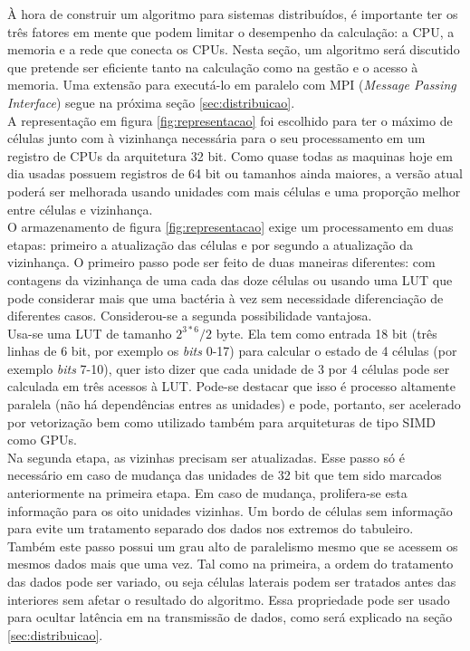 \label{sec:algoritmo}

À hora de construir um algoritmo para sistemas distribuídos, é importante ter os três fatores em mente que podem limitar o desempenho da calculação: a CPU, a memoria e a rede que conecta os CPUs. Nesta seção, um algoritmo será discutido que pretende ser eficiente tanto na calculação como na gestão e o acesso à memoria. Uma extensão para executá-lo em paralelo com MPI (\textit{Message Passing Interface}) segue na próxima seção \ref{sec:distribuicao}.\\

A representação em figura \ref{fig:representacao} foi escolhido para ter o máximo de células junto com à vizinhança necessária para o seu processamento em um registro de CPUs da arquitetura 32 bit. Como quase todas as maquinas hoje em dia usadas possuem registros de 64 bit ou tamanhos ainda maiores, a versão atual poderá ser melhorada usando unidades com mais células e uma proporção melhor entre células e vizinhança.\\

O armazenamento de figura \ref{fig:representacao} exige um processamento em duas etapas: primeiro a atualização das células e por segundo a atualização da vizinhança. O primeiro passo pode ser feito de duas maneiras diferentes: com contagens da vizinhança de uma cada das doze células ou usando uma LUT que pode considerar mais que uma bactéria à vez sem necessidade diferenciação de diferentes casos. Considerou-se a segunda possibilidade vantajosa.\\

Usa-se uma LUT de tamanho $2^{3*6}/2$ byte. Ela tem como entrada 18 bit (três linhas de 6 bit, por exemplo os \textit{bits} 0-17)  para calcular o estado de 4 células (por exemplo \textit{bits} 7-10), quer isto dizer que cada unidade de 3 por 4 células pode ser calculada em três acessos à LUT. Pode-se destacar que isso é processo altamente paralela (não há dependências entres as unidades) e pode, portanto, ser acelerado por vetorização bem como utilizado também para arquiteturas de tipo SIMD como GPUs.\\

Na segunda etapa, as vizinhas precisam ser atualizadas. Esse passo só é necessário em caso de mudança das unidades de 32 bit que tem sido marcados anteriormente na primeira etapa. Em caso de mudança, prolifera-se esta informação para os oito unidades vizinhas. Um bordo de células sem informação para evite um tratamento separado dos dados nos extremos do tabuleiro. Também este passo possui um grau alto de paralelismo mesmo que se acessem os mesmos dados mais que uma vez. Tal como na primeira, a ordem do tratamento das dados pode ser variado, ou seja células laterais podem ser tratados antes das interiores sem afetar o resultado do algoritmo. Essa propriedade pode ser usado para ocultar latência em na transmissão de dados, como será explicado na seção \ref{sec:distribuicao}.\\